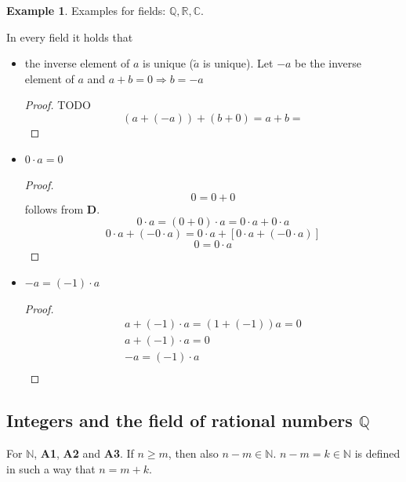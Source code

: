 \documentclass[a4paper,landscape,twocolumn]{article}
\theoremstyle{definition}
\newtheorem{ex}{Example}
\begin{document}
\begin{ex}
  Examples for fields: $\mathbb{Q}, \mathbb{R}, \mathbb{C}$.

  In every field it holds that
  \begin{itemize}
    \item the inverse element of $a$ is unique ($\tilde a$ is unique).
      Let $-a$ be the inverse element of $a$ and $a + b = 0 \Rightarrow b = -a$
      \begin{proof}
        TODO
        \[ (a + (-a)) + (b + 0) = a + b =  \]
      \end{proof}
    \item $0 \cdot a = 0$
      \begin{proof}
        \[ 0 = 0 + 0 \]
        follows from \textbf{D}.
        \[ 0 \cdot a = (0 + 0) \cdot a = 0 \cdot a + 0 \cdot a \]
        \[ 0 \cdot a + (-0 \cdot a) = 0 \cdot a + \left[0 \cdot a + (-0 \cdot a)\right] \]
        \[ 0 = 0 \cdot a \]
      \end{proof}
    \item $-a = (-1) \cdot a$
      \begin{proof}
        \begin{align*}
          a + (-1) \cdot a = (1 + (-1)) a = 0 \\
          a + (-1) \cdot a = 0 \\
          -a = (-1) \cdot a \\
        \end{align*}
      \end{proof}
  \end{itemize}
\end{ex}

\subsection{Integers and the field of rational numbers $\mathbb{Q}$}
%
For $\mathbb{N}$, \textbf{A1}, \textbf{A2} and \textbf{A3}.
If $n \geq m$, then also $n - m \in \mathbb{N}$.
$n-m = k \in \mathbb{N}$ is defined in such a way that $n = m + k$.
\end{document}
